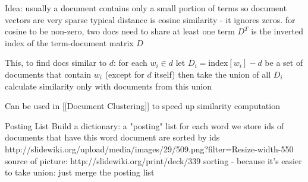 Idea:
usually a document contains only a small portion of terms
so document vectors are very sparse
typical distance is cosine similarity - it ignores zeros. for cosine to be non-zero, two docs need to share at least one term
$D^T$ is the inverted index of the term-document matrix $D$


This, to find docs similar to $d$:
for each $w_i \in d$
let $D_i = \text{index}[w_i] - d$ be a set of documents that contain $w_i$ (except for $d$ itself)
then take the union of all $D_i$
calculate similarity only with documents from this union


Can be used in [[Document Clustering]] to speed up similarity computation



Posting List 
Build a dictionary: a "posting" list
for each word we store ids of documents that have this word
document are sorted by ids
http://slidewiki.org/upload/media/images/29/509.png?filter=Resize-width-550
source of picture: http://slidewiki.org/print/deck/339
sorting - because it's easier to take union: just merge the posting list




